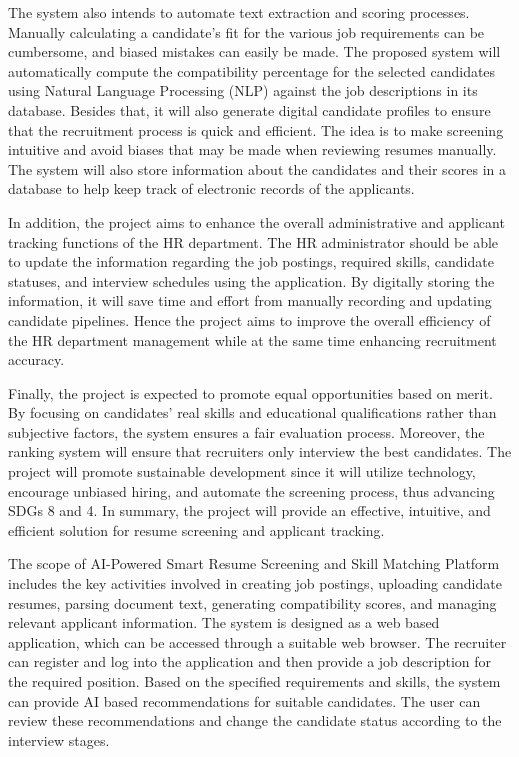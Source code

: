 \documentclass[12pt,a4paper]{report}
\begin{document}
The system also intends to automate text extraction and scoring processes. Manually calculating a candidate's fit for the various job requirements can be cumbersome, and biased mistakes can easily be made. The proposed system will automatically compute the compatibility percentage for the selected candidates using Natural Language Processing (NLP) against the job descriptions in its database. Besides that, it will also generate digital candidate profiles to ensure that the recruitment process is quick and efficient. The idea is to make screening intuitive and avoid biases that may be made when reviewing resumes manually. The system will also store information about the candidates and their scores in a database to help keep track of electronic records of the applicants.

In addition, the project aims to enhance the overall administrative and applicant tracking functions of the HR department. The HR administrator should be able to update the information regarding the job postings, required skills, candidate statuses, and interview schedules using the application. By digitally storing the information, it will save time and effort from manually recording and updating candidate pipelines. Hence the project aims to improve the overall efficiency of the HR department management while at the same time enhancing recruitment accuracy.

Finally, the project is expected to promote equal opportunities based on merit. By focusing on candidates' real skills and educational qualifications rather than subjective factors, the system ensures a fair evaluation process. Moreover, the ranking system will ensure that recruiters only interview the best candidates. The project will promote sustainable development since it will utilize technology, encourage unbiased hiring, and automate the screening process, thus advancing SDGs 8 and 4. In summary, the project will provide an effective, intuitive, and efficient solution for resume screening and applicant tracking.

The scope of AI-Powered Smart Resume Screening and Skill Matching Platform includes the key activities involved in creating job postings, uploading candidate resumes, parsing document text, generating compatibility scores, and managing relevant applicant information. The system is designed as a web based application, which can be accessed through a suitable web browser. The recruiter can register and log into the application and then provide a job description for the required position. Based on the specified requirements and skills, the system can provide AI based recommendations for suitable candidates. The user can review these recommendations and change the candidate status according to the interview stages.
\end{document}
